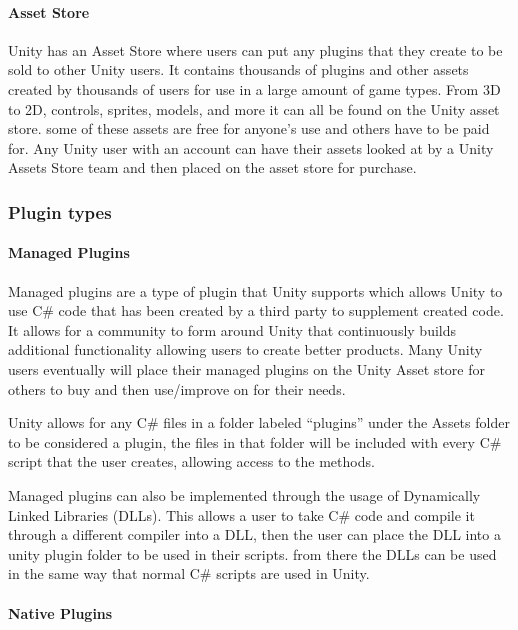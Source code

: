 \documentclass[12pt]{article}
\begin{document}
\paragraph{Asset Store}\label{asset-store}

Unity has an Asset Store where users can put any plugins that they
create to be sold to other Unity users. It contains thousands of plugins
and other assets created by thousands of users for use in a large amount
of game types. From 3D to 2D, controls, sprites, models, and more it can
all be found on the Unity asset store. some of these assets are free for
anyone's use and others have to be paid for. Any Unity user with an
account can have their assets looked at by a Unity Assets Store team and
then placed on the asset store for purchase.

\subsubsection{Plugin types}\label{plugin-types}

\paragraph{Managed Plugins}\label{managed-plugins}

Managed plugins are a type of plugin that Unity supports which allows
Unity to use C\# code that has been created by a third party to
supplement created code. It allows for a community to form around Unity
that continuously builds additional functionality allowing users to
create better products. Many Unity users eventually will place their
managed plugins on the Unity Asset store for others to buy and then
use/improve on for their needs.

Unity allows for any C\# files in a folder labeled ``plugins'' under the
Assets folder to be considered a plugin, the files in that folder will
be included with every C\# script that the user creates, allowing access
to the methods.

Managed plugins can also be implemented through the usage of Dynamically
Linked Libraries (DLLs). This allows a user to take C\# code and compile
it through a different compiler into a DLL, then the user can place the
DLL into a unity plugin folder to be used in their scripts. from there
the DLLs can be used in the same way that normal C\# scripts are used in
Unity. \autocite{unityManaged}

\paragraph{Native Plugins}\label{native-plugins}
\end{document}

